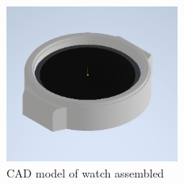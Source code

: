 \documentclass[12pt, titlepage]{article}
\begin{document}
\begin{figure}[H]
	\begin{center}
		 \includegraphics[width=0.5\textwidth]{WatchCAD2}
		\caption{CAD model of watch assembled}
		\label{WatchCAD2} 
	\end{center}
\end{figure}
\end{document}
